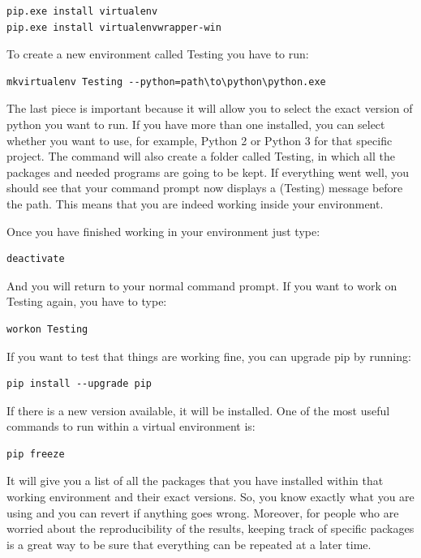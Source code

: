 \begin{verbatim}
pip.exe install virtualenv
pip.exe install virtualenvwrapper-win
\end{verbatim}

To create a new environment called Testing you have to run:

\begin{verbatim}
mkvirtualenv Testing --python=path\to\python\python.exe
\end{verbatim}

The last piece is important because it will allow you to select the exact version of python you want to run. If you have more than one installed, you can select whether you want to use, for example, Python 2 or Python 3 for that specific project. The command will also create a folder called Testing, in which all the packages and needed programs are going to be kept. If everything went well, you should see that your command prompt now displays a (Testing) message before the path. This means that you are indeed working inside your environment.

Once you have finished working in your environment just type:

\begin{verbatim}
deactivate
\end{verbatim}

And you will return to your normal command prompt. If you want to work on Testing again, you have to type:

\begin{verbatim}
workon Testing
\end{verbatim}

If you want to test that things are working fine, you can upgrade pip by running:

\begin{verbatim}
pip install --upgrade pip
\end{verbatim}

If there is a new version available, it will be installed. One of the most useful commands to run within a virtual environment is:

\begin{verbatim}
pip freeze
\end{verbatim}

It will give you a list of all the packages that you have installed within that working environment and their exact versions. So, you know exactly what you are using and you can revert if anything goes wrong. Moreover, for people who are worried about the reproducibility of the results, keeping track of specific packages is a great way to be sure that everything can be repeated at a later time. 

